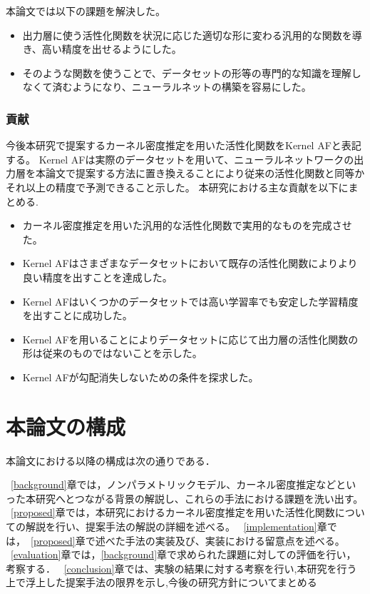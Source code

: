 本論文では以下の課題を解決した。
\begin{itemize}
  \item 出力層に使う活性化関数を状況に応じた適切な形に変わる汎用的な関数を導き、高い精度を出せるようにした。
  \item そのような関数を使うことで、データセットの形等の専門的な知識を理解しなくて済むようになり、ニューラルネットの構築を容易にした。
\end{itemize}

\subsubsection{貢献}

今後本研究で提案するカーネル密度推定を用いた活性化関数をKernel AFと表記する。
Kernel AFは実際のデータセットを用いて、ニューラルネットワークの出力層を本論文で提案する方法に置き換えることにより従来の活性化関数と同等かそれ以上の精度で予測できること示した。
本研究における主な貢献を以下にまとめる.

\begin{itemize}
  \item カーネル密度推定を用いた汎用的な活性化関数で実用的なものを完成させた。
  \item Kernel AFはさまざまなデータセットにおいて既存の活性化関数によりより良い精度を出すことを達成した。
  \item Kernel AFはいくつかのデータセットでは高い学習率でも安定した学習精度を出すことに成功した。
  \item Kernel AFを用いることによりデータセットに応じて出力層の活性化関数の形は従来のものではないことを示した。
  \item Kernel AFが勾配消失しないための条件を探求した。
\end{itemize}


\section{本論文の構成}

本論文における以降の構成は次の通りである．

~\ref{background}章では，ノンパラメトリックモデル、カーネル密度推定などといった本研究へとつながる背景の解説し、これらの手法における課題を洗い出す。
~\ref{proposed}章では，本研究におけるカーネル密度推定を用いた活性化関数についての解説を行い、提案手法の解説の詳細を述べる。
~\ref{implementation}章では，~\ref{proposed}章で述べた手法の実装及び、実装における留意点を述べる。
~\ref{evaluation}章では，\ref{background}章で求められた課題に対しての評価を行い，考察する．
~\ref{conclusion}章では、実験の結果に対する考察を行い,本研究を行う上で浮上した提案手法の限界を示し,今後の研究方針についてまとめる






